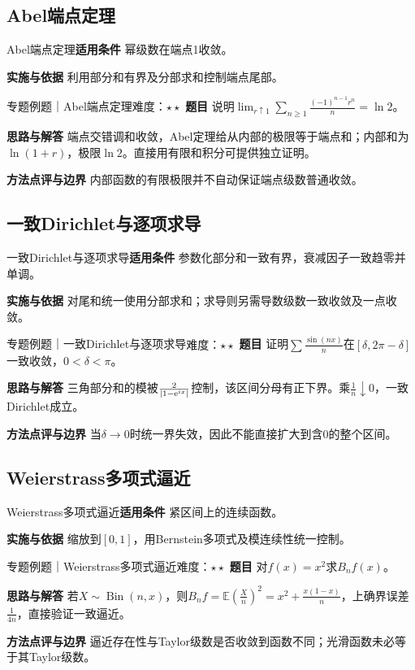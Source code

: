 \subsection{Abel端点定理}\label{mat:series_methods:abel}
\begin{method}{Abel端点定理}\textbf{适用条件} 幂级数在端点1收敛。\par\textbf{实施与依据} 利用部分和有界及分部求和控制端点尾部。\end{method}
\begin{example}{专题例题｜Abel端点定理}{难度：$\star\star$}
\textbf{题目} 说明$\lim_{r\uparrow1}\sum_{n\ge1}\frac{(-1)^{n-1}r^n}{n}=\ln2$。\par\textbf{思路与解答} 端点交错调和收敛，Abel定理给从内部的极限等于端点和；内部和为$\ln(1+r)$，极限$\ln2$。直接用有限和积分可提供独立证明。\par\textbf{方法点评与边界} 内部函数的有限极限并不自动保证端点级数普通收敛。
\end{example}
\subsection{一致Dirichlet与逐项求导}\label{mat:series_methods:diruniform}
\begin{method}{一致Dirichlet与逐项求导}\textbf{适用条件} 参数化部分和一致有界，衰减因子一致趋零并单调。\par\textbf{实施与依据} 对尾和统一使用分部求和；求导则另需导数级数一致收敛及一点收敛。\end{method}
\begin{example}{专题例题｜一致Dirichlet与逐项求导}{难度：$\star\star$}
\textbf{题目} 证明$\sum\frac{\sin(nx)}{n}$在$[\delta,2\pi-\delta]$一致收敛，$0<\delta<\pi$。\par\textbf{思路与解答} 三角部分和的模被$\frac{2}{|1-\mathrm{e}^{ix}|}$控制，该区间分母有正下界。乘$\frac{1}{n}\downarrow0$，一致Dirichlet成立。\par\textbf{方法点评与边界} 当$\delta\to0$时统一界失效，因此不能直接扩大到含0的整个区间。
\end{example}
\subsection{Weierstrass多项式逼近}\label{mat:series_methods:weierstrass}
\begin{method}{Weierstrass多项式逼近}\textbf{适用条件} 紧区间上的连续函数。\par\textbf{实施与依据} 缩放到$[0,1]$，用Bernstein多项式及模连续性统一控制。\end{method}
\begin{example}{专题例题｜Weierstrass多项式逼近}{难度：$\star\star$}
\textbf{题目} 对$f(x)=x^2$求$B_nf(x)$。\par\textbf{思路与解答} 若$X\sim\operatorname{Bin}(n,x)$，则$B_nf=\mathbb E(\frac{X}{n})^2=x^2+\frac{x(1-x)}{n}$，上确界误差$\frac{1}{4n}$，直接验证一致逼近。\par\textbf{方法点评与边界} 逼近存在性与Taylor级数是否收敛到函数不同；光滑函数未必等于其Taylor级数。
\end{example}
